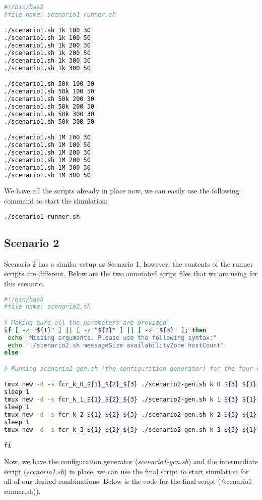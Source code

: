 \begin{lstlisting}[language=bash]
#!/bin/bash
#file name: scenario1-runner.sh

./scenario1.sh 1k 100 30
./scenario1.sh 1k 100 50
./scenario1.sh 1k 200 30
./scenario1.sh 1k 200 50
./scenario1.sh 1k 300 30
./scenario1.sh 1k 300 50

./scenario1.sh 50k 100 30
./scenario1.sh 50k 100 50
./scenario1.sh 50k 200 30
./scenario1.sh 50k 200 50
./scenario1.sh 50k 300 30
./scenario1.sh 50k 300 50

./scenario1.sh 1M 100 30
./scenario1.sh 1M 100 50
./scenario1.sh 1M 200 30
./scenario1.sh 1M 200 50
./scenario1.sh 1M 300 30
./scenario1.sh 1M 300 50
\end{lstlisting}
\vspace{5mm}
We have all the scripts already in place now, we can easily use the following command to start the simulation:
\begin{lstlisting}[language=bash]
./scenario1-runner.sh
\end{lstlisting}

\subsection{Scenario 2}
Scenario 2 has a similar setup as Scenario 1, however, the contents of the runner scripts are different. Below are the two annotated script files that we are using for this scenario.

\begin{lstlisting}[language=bash]
#!/bin/bash
#file name: scenario2.sh

# Making sure all the parameters are provided
if [ -z "${1}" ] || [ -z "${2}" ] || [ -z "${3}" ]; then
 echo "Missing arguments. Please use the following syntax:"
 echo "./scenario2.sh messageSize availabilityZone hostCount"
else

# Running scenario2-gen.sh (the configuration generator) for the four different values snapping to accessing point(k=0,1,2,3).

tmux new -d -s fcr_k_0_${1}_${2}_${3} ./scenario2-gen.sh k 0 ${3} ${1} ${2}
sleep 1
tmux new -d -s fcr_k_1_${1}_${2}_${3} ./scenario2-gen.sh k 1 ${3} ${1} ${2}
sleep 1
tmux new -d -s fcr_k_2_${1}_${2}_${3} ./scenario2-gen.sh k 2 ${3} ${1} ${2}
sleep 1
tmux new -d -s fcr_k_3_${1}_${2}_${3} ./scenario2-gen.sh k 3 ${3} ${1} ${2}

fi
\end{lstlisting}
\vspace{5mm}
Now, we have the configuration generator (\textit{scenario1-gen.sh}) and the intermediate script (\textit{scenario1.sh}) in place, we can use the final script to start simulation for all of our desired combinations. Below is the code for the final script (\textit(scenario1-runner.sh)).

